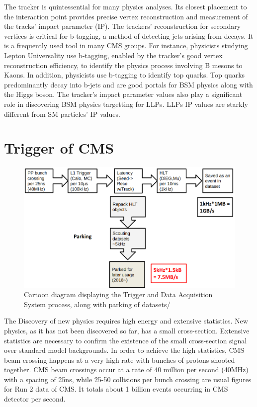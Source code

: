 The tracker is quintessential for many physics analyses.
Its closest placement to the interaction point provides precise vertex reconstruction and measurement of the tracks' impact parameter (IP).
The trackers' reconstruction for secondary vertices is critical for b-tagging, a method of detecting jets arising from \PQb decays.
It is a frequently used tool in many CMS groups.
For instance, physicists studying Lepton Universality use b-tagging, enabled by the tracker's good vertex reconstruction efficiency, to identify the physics process involving B mesons to Kaons.
In addition, physicists use b-tagging to identify top quarks.
Top quarks predominantly decay into b-jets and are good portals for BSM physics along with the Higgs boson.
The tracker's impact parameter values also play a significant role in discovering BSM physics targetting for LLPs.
LLPs IP values are starkly different from SM particles' IP values.


\section{Trigger of CMS}
\begin{figure}[h!]
  \label{fig:trig}
  \centering
  \includegraphics[width=0.95\linewidth]{figs/Trig.png}
	\caption{Cartoon diagram displaying the Trigger and Data Acquisition System process, along with parking of datasets/}
\end{figure}
The Discovery of new physics requires high energy and extensive statistics.
New physics, as it has not been discovered so far, has a small cross-section.
Extensive statistics are necessary to confirm the existence of the small cross-section signal over standard model backgrounds.
In order to achieve the high statistics, CMS beam crossing happens at a very high rate with bunches of protons shooted together.
CMS beam crossings occur at a rate of 40 million per second (40MHz) with a spacing of 25ns, while 25-50 collisions per bunch crossing are usual figures for Run 2 data of CMS.
It totals about 1 billion events occurring in CMS detector per second.


